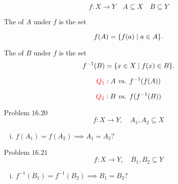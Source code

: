 \begin{frame}{}
  \[
    f: X \to Y \quad A \subseteq X \quad B \subseteq Y
  \]

  \begin{definition}[Image]
    The  of $A$ under $f$ is the set

    \[
      f(A) = \{f(a) \mid a \in A\}.
    \]
  \end{definition}

  \vspace{0.60cm}
  \begin{definition}
    The  of $B$ under $f$ is the set
    \[
      f^{-1}(B) = \{x \in X \mid f(x) \in B\}.
    \]
  \end{definition}
\end{frame}

\begin{frame}{}
  \[
    \textcolor{red}{Q_1}: A \emph{ vs. } f^{-1}(f(A))
  \]

  \[
    \textcolor{red}{Q_2}: B \emph{ vs. } f(f^{-1}(B))
  \]
\end{frame}

\begin{frame}{}
  \begin{exampleblock}{Problem $16.20$}
    \[
      f: X \to Y, \quad A_1, A_2 \subseteq X
    \]

    \begin{enumerate}[(i)]
      \centering
      \item $f(A_1) = f(A_2) \implies A_1 = A_2?$
    \end{enumerate}
  \end{exampleblock}
\end{frame}

\begin{frame}{}
  \begin{exampleblock}{Problem $16.21$}
    \[
      f: X \to Y, \quad B_1, B_2 \subseteq Y
    \]

    \begin{enumerate}[(i)]
      \centering
      \item $f^{-1}(B_1) = f^{-1}(B_2) \implies B_1 = B_2?$
    \end{enumerate}
  \end{exampleblock}
\end{frame}
